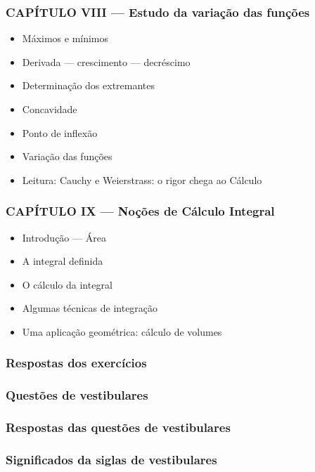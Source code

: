 \documentclass[a4paper,12pt]{article}[abntex2]
\begin{document}
\subsubsection*{CAPÍTULO VIII — Estudo da variação das funções}

\begin{itemize}
\item Máximos e mínimos
\item Derivada — crescimento — decréscimo
\item Determinação dos extremantes
\item Concavidade
\item Ponto de inflexão
\item Variação das funções
\item Leitura: Cauchy e Weierstrass: o rigor chega ao Cálculo
\end{itemize}
\subsubsection*{CAPÍTULO IX — Noções de Cálculo Integral}

\begin{itemize}
\item Introdução — Área
\item A integral definida
\item O cálculo da integral
\item Algumas técnicas de integração
\item Uma aplicação geométrica: cálculo de volumes
\end{itemize}
\subsubsection*{Respostas dos exercícios}

\subsubsection*{Questões de vestibulares}

\subsubsection*{Respostas das questões de vestibulares}

\subsubsection*{Significados da siglas de vestibulares}
\end{document}
